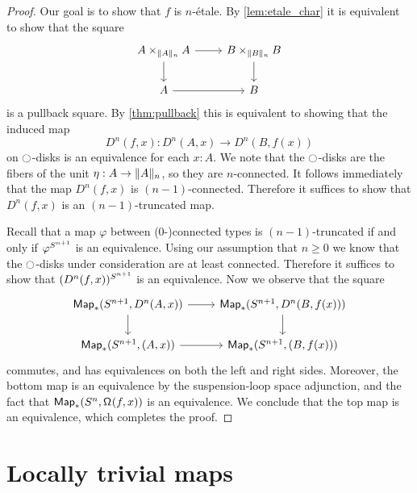 \documentclass[9pt,twosided]{amsart}
\begin{document}
\begin{proof}
  Our goal is to show that $f$ is $n$-\'etale. By \cref{lem:etale_char} it is equivalent to show that the square
  \begin{equation*}
    \begin{tikzcd}
      A\times_{\trunc{n}{A}} A \arrow[r] \arrow[d] & B \times_{\trunc{n}{B}} B \arrow[d] \\
      A \arrow[r] & B
    \end{tikzcd}
  \end{equation*}
  is a pullback square. By \cref{thm:pullback} this is equivalent to showing that the induced map
  \begin{equation*}
    D^{n}(f,x):D^{n}(A,x)\to D^{n}(B,f(x))
  \end{equation*}
  on ${\ocircle}$-disks is an equivalence for each $x:A$. We note that the ${\ocircle}$-disks are the fibers of the unit $\eta:A \to \trunc{n}{A}$, so they are $n$-connected. It follows immediately that the map $D^{n}(f,x)$ is $(n-1)$-connected. Therefore it suffices to show that $D^{n}(f,x)$ is an $(n-1)$-truncated map.

  Recall that a map $\varphi$ between ($0$-)connected types is $(n-1)$-truncated if and only if $\varphi^{S^{n+1}}$ is an equivalence. Using our assumption that $n\geq 0$ we know that the ${\ocircle}$-disks under consideration are at least connected. Therefore it suffices to show that $(D^{n}(f,x))^{S^{n+1}}$ is an equivalence. Now we observe that the square
  \begin{equation*}
    \begin{tikzcd}
      \mathsf{Map}_\ast(\sphere{n+1},D^{n}(A,x)) \arrow[r] \arrow[d] & \mathsf{Map}_\ast(\sphere{n+1},D^{n}(B,f(x))) \arrow[d] \\
      \mathsf{Map}_\ast(\sphere{n+1},(A,x)) \arrow[r] & \mathsf{Map}_\ast(\sphere{n+1},(B,f(x)))
    \end{tikzcd}
  \end{equation*}
  commutes, and has equivalences on both the left and right sides. Moreover, the bottom map is an equivalence by the suspension-loop space adjunction, and the fact that $\mathsf{Map}_\ast(S^{n},\mathsf{\Omega}^{}(f,x))$ is an equivalence. We conclude that the top map is an equivalence, which completes the proof.
\end{proof}

\section{Locally trivial maps}
\end{document}
